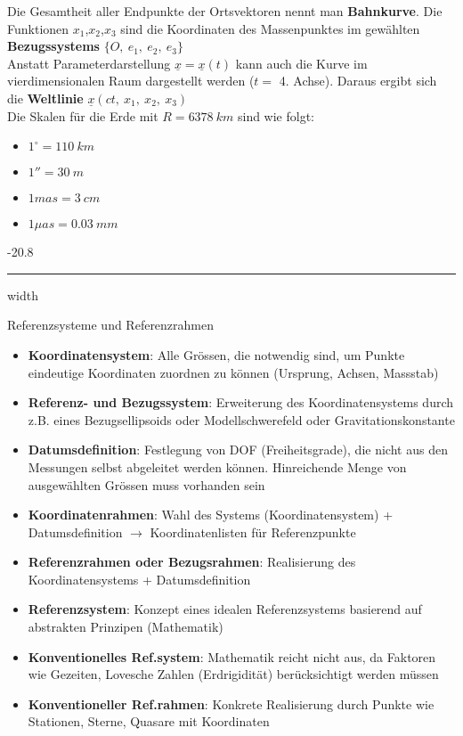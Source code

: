 \documentclass[9pt, landscape, fleqn]{scrartcl}
\makeatletter
\renewcommand{\subsubsection}{\@startsection{subsubsection}{1}{0mm}%
{-2\baselineskip}{0.8\baselineskip}%
{\hrule depth 0.2pt width\columnwidth\vspace*{1.2em}\normalsize\bfseries\rmfamily}}
\makeatother
\begin{document}
\begin{multicols*}{3}
Die Gesamtheit aller Endpunkte der Ortsvektoren nennt man \textbf{Bahnkurve}. Die Funktionen $x_1$,$x_2$,$x_3$ sind die Koordinaten des Massenpunktes im gewählten \textbf{Bezugssystems} $\{O,~e_1,~e_2,~e_3\}$ \\

Anstatt Parameterdarstellung $\underline{x}=\underline{x}(t)$ kann auch die Kurve im vierdimensionalen Raum dargestellt werden ($t =$ 4. Achse). Daraus ergibt sich die \textbf{Weltlinie} $\underline{x}(ct,~x_1,~x_2,~x_3)$ \\

Die Skalen für die Erde mit $R=6378~km$ sind wie folgt:

\begin{itemize}
    \item $1^\circ = 110~km$ 
    \item $1'' = 30~m$
    \item $1 mas = 3~cm$
    \item $1 \mu as = 0.03~mm$
\end{itemize}

\subsubsection{Referenzsysteme und Referenzrahmen}

\begin{itemize}
    \item \textbf{Koordinatensystem}: Alle Grössen, die notwendig sind, um Punkte eindeutige Koordinaten zuordnen zu können (Ursprung, Achsen, Massstab)
    \item \textbf{Referenz- und Bezugssystem}: Erweiterung des Koordinatensystems durch z.B. eines Bezugsellipsoids oder Modellschwerefeld oder Gravitationskonstante
    \item \textbf{Datumsdefinition}: Festlegung von DOF (Freiheitsgrade), die nicht aus den Messungen selbst abgeleitet werden können. Hinreichende Menge von ausgewählten Grössen muss vorhanden sein 
    \item \textbf{Koordinatenrahmen}: Wahl des Systems (Koordinatensystem) + Datumsdefinition $\rightarrow$ Koordinatenlisten für Referenzpunkte
    \item \textbf{Referenzrahmen oder Bezugsrahmen}: Realisierung des Koordinatensystems + Datumsdefinition
    \item \textbf{Referenzsystem}: Konzept eines idealen Referenzsystems basierend auf abstrakten Prinzipen (Mathematik)
    \item \textbf{Konventionelles Ref.system}: Mathematik reicht nicht aus, da Faktoren wie Gezeiten, Lovesche Zahlen (Erdrigidität) berücksichtigt werden müssen
    \item \textbf{Konventioneller Ref.rahmen}: Konkrete Realisierung durch Punkte wie Stationen, Sterne, Quasare mit Koordinaten
\end{itemize}


\end{multicols*}
\end{document}
